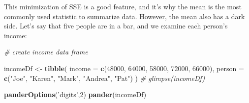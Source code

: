 \documentclass[]{book}
\newenvironment{Shaded}{\begin{snugshade}}{\end{snugshade}}
\newcommand{\KeywordTok}[1]{\textcolor[rgb]{0.13,0.29,0.53}{\textbf{#1}}}
\newcommand{\DataTypeTok}[1]{\textcolor[rgb]{0.13,0.29,0.53}{#1}}
\newcommand{\DecValTok}[1]{\textcolor[rgb]{0.00,0.00,0.81}{#1}}
\newcommand{\StringTok}[1]{\textcolor[rgb]{0.31,0.60,0.02}{#1}}
\newcommand{\CommentTok}[1]{\textcolor[rgb]{0.56,0.35,0.01}{\textit{#1}}}
\newcommand{\NormalTok}[1]{#1}
\theoremstyle{definition}
\theoremstyle{definition}
\theoremstyle{definition}
\theoremstyle{remark}
\begin{document}
This minimization of SSE is a good feature, and it's why the mean is the
most commonly used statistic to summarize data. However, the mean also
has a dark side. Let's say that five people are in a bar, and we examine
each person's income:

\begin{Shaded}
\begin{Highlighting}[]
\CommentTok{# create income data frame}

\NormalTok{incomeDf <-}\StringTok{ }
\StringTok{  }\KeywordTok{tibble}\NormalTok{(}
  \DataTypeTok{income =} \KeywordTok{c}\NormalTok{(}\DecValTok{48000}\NormalTok{, }\DecValTok{64000}\NormalTok{, }\DecValTok{58000}\NormalTok{, }\DecValTok{72000}\NormalTok{, }\DecValTok{66000}\NormalTok{),}
  \DataTypeTok{person =} \KeywordTok{c}\NormalTok{(}\StringTok{"Joe"}\NormalTok{, }\StringTok{"Karen"}\NormalTok{, }\StringTok{"Mark"}\NormalTok{, }\StringTok{"Andrea"}\NormalTok{, }\StringTok{"Pat"}\NormalTok{)}
\NormalTok{)}
\CommentTok{# glimpse(incomeDf)}

\KeywordTok{panderOptions}\NormalTok{(}\StringTok{'digits'}\NormalTok{,}\DecValTok{2}\NormalTok{)}
\KeywordTok{pander}\NormalTok{(incomeDf)}
\end{Highlighting}
\end{Shaded}
\end{document}
